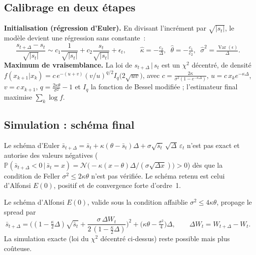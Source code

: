 \documentclass[11pt,a4paper]{article}
\begin{document}
\subsection{Calibrage en deux étapes}
\begin{definitionbox}
\textbf{Initialisation (régression d'Euler).} En divisant l'incrément par $\sqrt{|s_t|}$, le modèle devient une régression sans constante~:
\[
\frac{s_{t+\Delta}-s_t}{\sqrt{|s_t|}}\sim c_1\frac{1}{\sqrt{|s_t|}}+c_2\frac{s_t}{\sqrt{|s_t|}}+\epsilon_t,
\qquad
\widehat\kappa=-\tfrac{c_2}{\Delta},\;\;\widehat\theta=-\tfrac{c_1}{c_2},\;\;\widehat\sigma^2=\tfrac{\operatorname{Var}(\epsilon)}{\Delta}.
\]
\textbf{Maximum de vraisemblance.} La loi de $s_{t+\Delta}\,|\,s_t$ est un $\chi^2$ décentré, de densité $f(x_{k+1}|x_k)=c\,e^{-(u+v)}(v/u)^{q/2}I_q\!\big(2\sqrt{uv}\big)$, avec $c=\tfrac{2\kappa}{\sigma^2(1-e^{-\kappa\Delta})}$, $u=c\,x_k e^{-\kappa\Delta}$, $v=c\,x_{k+1}$, $q=\tfrac{2\kappa\theta}{\sigma^2}-1$ et $I_q$ la fonction de Bessel modifiée ; l'estimateur final maximise $\sum_k\log f$.
\end{definitionbox}

\subsection{Simulation : schéma final}
Le schéma d'Euler $\bar s_{t+\Delta}=\bar s_t+\kappa(\theta-\bar s_t)\Delta+\sigma\sqrt{\bar s_t}\,\sqrt{\Delta}\,\varepsilon_t$ n'est pas exact et autorise des valeurs négatives ($\mathbb P(\bar s_{t+\Delta}<0\,|\,\bar s_t=x)=\mathcal N\!\big(-\kappa(x-\theta)\Delta/(\sigma\sqrt{\Delta x})\big)>0$) dès que la condition de Feller $\sigma^2\le 2\kappa\theta$ n'est pas vérifiée. Le schéma retenu est celui d'Alfonsi $E(0)$, positif et de convergence forte d'ordre~1.
\begin{definitionbox}
Le schéma d'Alfonsi $E(0)$, valide sous la condition affaiblie $\sigma^2\le 4\kappa\theta$, propage le spread par
\[
\bar s_{t+\Delta}=\Big((1-\tfrac{\kappa}{2}\Delta)\sqrt{\bar s_t}+\frac{\sigma\,\Delta W_t}{2\,(1-\tfrac{\kappa}{2}\Delta)}\Big)^{\!2}+\Big(\kappa\theta-\tfrac{\sigma^2}{4}\Big)\Delta,\qquad \Delta W_t=W_{t+\Delta}-W_t .
\]
La simulation exacte (loi du $\chi^2$ décentré ci-dessus) reste possible mais plus coûteuse.
\end{definitionbox}
\end{document}
